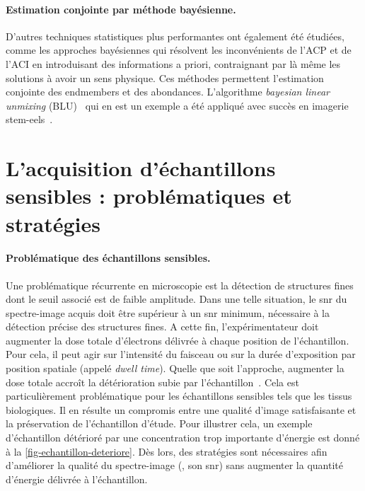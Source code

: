     \paragraph{Estimation conjointe par méthode bayésienne.} D'autres techniques statistiques plus performantes ont également été étudiées, comme les approches bayésiennes qui résolvent les inconvénients de l'ACP et de l'ACI en introduisant des informations a priori, contraignant par là même les solutions à avoir un sens physique. Ces méthodes permettent l'estimation conjointe des endmembers et des abondances. L'algorithme \textit{bayesian linear unmixing} (BLU)~\cite{dobigeon2009joint} qui en est un exemple a été appliqué avec succès en imagerie \gls{stem}-\gls{eels}~\cite{dobigeon2012spectral}.
    
    
    \section{L'acquisition d'échantillons sensibles : problématiques et stratégies}\label{sec-ech-sensibles}

    \paragraph{Problématique des échantillons sensibles.} Une problématique récurrente en microscopie est la détection de structures fines dont le seuil associé est de faible amplitude. Dans une telle situation, le \gls{snr} du spectre-image acquis doit être supérieur à un \gls{snr} minimum, nécessaire à la détection précise des structures fines. A cette fin, l'expérimentateur doit augmenter la dose totale d'électrons délivrée à chaque position de l'échantillon. Pour cela, il peut agir sur l'intensité du faisceau ou sur la durée d'exposition par position spatiale (appelé \emph{dwell time}). Quelle que soit l'approche, augmenter la dose totale accroît la détérioration subie par l'échantillon~\cite{egerton2004radiation}. Cela est particulièrement problématique pour les échantillons sensibles tels que les tissus biologiques. 
    Il en résulte un compromis entre une qualité d'image satisfaisante et la préservation de l'échantillon d'étude. Pour illustrer cela, un exemple d'échantillon détérioré par une concentration trop importante d'énergie est donné à la \cref{fig-echantillon-deteriore}. Dès lors, des stratégies sont nécessaires afin d'améliorer la qualité du spectre-image (\ie{}, son \gls{snr}) sans augmenter la quantité d'énergie délivrée à l'échantillon.

